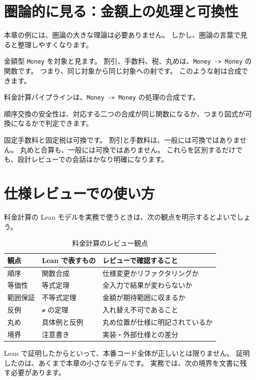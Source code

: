 \section{圏論的に見る：金額上の処理と可換性}

本章の例には、圏論の大きな理論は必要ありません。
しかし、圏論の言葉で見ると整理しやすくなります。

金額型 \texttt{Money} を対象と見ます。
割引、手数料、税、丸めは、\texttt{Money -> Money} の関数です。
つまり、同じ対象から同じ対象への射です。
このような射は合成できます。

料金計算パイプラインは、\texttt{Money -> Money} の処理の合成です。

順序交換の安全性は、対応する二つの合成が同じ関数になるか、つまり図式が可換になるかで判定できます。

固定手数料と固定税は可換です。
割引と手数料は、一般には可換ではありません。
丸めと合算も、一般には可換ではありません。
これらを区別するだけでも、設計レビューでの会話はかなり明確になります。

\section{仕様レビューでの使い方}

料金計算の Lean モデルを実務で使うときは、次の観点を明示するとよいでしょう。

\begin{table}[htbp]
\centering
\caption{料金計算のレビュー観点}
\label{tab:ch26-review-points}
\begin{tabular}{lll}
\toprule
観点 & Lean で表すもの & レビューで確認すること \\
\midrule
順序 & 関数合成 & 仕様変更かリファクタリングか \\
等価性 & 等式定理 & 全入力で結果が変わらないか \\
範囲保証 & 不等式定理 & 金額が期待範囲に収まるか \\
反例 & \texttt{≠} の定理 & 入れ替え不可であること \\
丸め & 具体例と反例 & 丸め位置が仕様に明記されているか \\
境界 & 注意書き & 実装・外部仕様との差分 \\
\bottomrule
\end{tabular}
\end{table}

Lean で証明したからといって、本番コード全体が正しいとは限りません。
証明したのは、あくまで本章の小さなモデルです。
実務では、次の境界を文書に残す必要があります。

